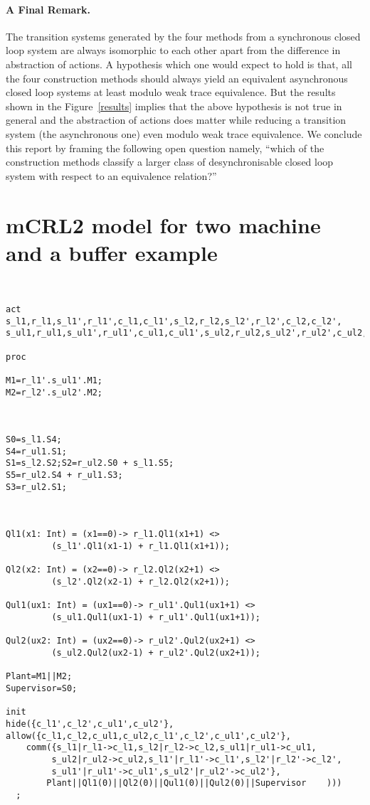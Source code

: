 \documentclass[a4paper,english,final]{article}
\theoremstyle{plain}
\theoremstyle{definition}
\begin{document}
\paragraph{A Final Remark.} The transition systems generated by the four methods from a synchronous closed loop system are always isomorphic to each other apart from the difference in abstraction of actions. A hypothesis which one would expect to hold is that, all the four construction methods should always yield an equivalent asynchronous closed loop systems at least modulo weak trace equivalence. But the results shown in the Figure~\ref{results} implies that the above hypothesis is not true in general and the abstraction of actions does matter while reducing a transition system (the asynchronous one) even modulo weak trace equivalence. We conclude this report by framing the following open question namely, ``which of the construction methods classify a larger class of desynchronisable closed loop system with respect to an equivalence relation?''





\appendix
\section{mCRL2 model for two machine and a buffer example}\label{appendix-2machbuf}
\begin{verbatim}


act
s_l1,r_l1,s_l1',r_l1',c_l1,c_l1',s_l2,r_l2,s_l2',r_l2',c_l2,c_l2',
s_ul1,r_ul1,s_ul1',r_ul1',c_ul1,c_ul1',s_ul2,r_ul2,s_ul2',r_ul2',c_ul2,c_ul2';

proc

M1=r_l1'.s_ul1'.M1;
M2=r_l2'.s_ul2'.M2;



S0=s_l1.S4;
S4=r_ul1.S1;
S1=s_l2.S2;S2=r_ul2.S0 + s_l1.S5;
S5=r_ul2.S4 + r_ul1.S3;
S3=r_ul2.S1;



Ql1(x1: Int) = (x1==0)-> r_l1.Ql1(x1+1) <>
		 (s_l1'.Ql1(x1-1) + r_l1.Ql1(x1+1));

Ql2(x2: Int) = (x2==0)-> r_l2.Ql2(x2+1) <>
		 (s_l2'.Ql2(x2-1) + r_l2.Ql2(x2+1));

Qul1(ux1: Int) = (ux1==0)-> r_ul1'.Qul1(ux1+1) <>
		 (s_ul1.Qul1(ux1-1) + r_ul1'.Qul1(ux1+1));

Qul2(ux2: Int) = (ux2==0)-> r_ul2'.Qul2(ux2+1) <>
		 (s_ul2.Qul2(ux2-1) + r_ul2'.Qul2(ux2+1));

Plant=M1||M2;
Supervisor=S0;

init
hide({c_l1',c_l2',c_ul1',c_ul2'},
allow({c_l1,c_l2,c_ul1,c_ul2,c_l1',c_l2',c_ul1',c_ul2'},
    comm({s_l1|r_l1->c_l1,s_l2|r_l2->c_l2,s_ul1|r_ul1->c_ul1,
         s_ul2|r_ul2->c_ul2,s_l1'|r_l1'->c_l1',s_l2'|r_l2'->c_l2',
         s_ul1'|r_ul1'->c_ul1',s_ul2'|r_ul2'->c_ul2'},
        Plant||Ql1(0)||Ql2(0)||Qul1(0)||Qul2(0)||Supervisor    )))
  ;
\end{verbatim}
\end{document}
